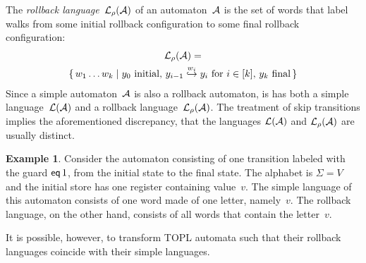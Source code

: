 \documentclass[9pt, preprint]{sigplanconf} %
\theoremstyle{definition}
\newtheorem{example}{Example}
\theoremstyle{remark}
\begin{document}
The \emph{rollback language}~${\cal L}_\rho({\cal A})$ of an automaton~${\cal A}$ is the set of words that label walks from some initial rollback configuration to some final rollback configuration:
\begin{multline*}
{\cal L}_\rho({\cal A})=\\ 
  \{\,w_1\ldots w_k\mid
    \text{$y_0$~initial,
    $y_{i-1}\stackrel{w_i}\hookrightarrow y_i$ for $i\in[k]$,
    $y_k$~final}\,\}
\end{multline*}
Since a simple automaton~${\cal A}$ is also a rollback automaton, is has both a simple language~${\cal L}({\cal A})$ and a rollback language~${\cal L}_\rho({\cal A})$.
The treatment of skip transitions implies the aforementioned
discrepancy, that the languages ${\cal L}({\cal A})$ and ${\cal L}_\rho({\cal A})$ are usually distinct.

\begin{example}
Consider the automaton consisting of one transition labeled with the guard ${\sf eq}\,1$, from the initial state to the final state.
The alphabet is $\Sigma=V$ and the initial store has one register containing value~$v$.
The simple language of this automaton consists of one word made of one letter, namely~$v$.
The rollback language, on the other hand, consists of all words that contain the letter~$v$.
\end{example}

It is possible, however, to transform TOPL automata such that their rollback languages coincide with their simple languages.
\end{document}
